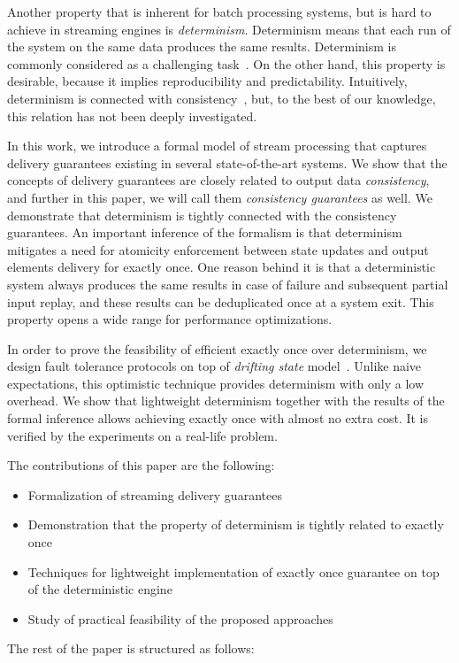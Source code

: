 Another property that is inherent for batch processing systems, but is hard to achieve in streaming engines is {\em determinism}. Determinism means that each run of the system on the same data produces the same results. Determinism is commonly considered as a challenging task~\cite{Zacheilas:2017:MDS:3093742.3093921}. On the other hand, this property is desirable, because it implies reproducibility and predictability. Intuitively, determinism is connected with consistency~\cite{Stonebraker:2005:RRS:1107499.1107504}, but, to the best of our knowledge, this relation has not been deeply investigated. 

In this work, we introduce a formal model of stream processing that captures delivery guarantees existing in several state-of-the-art systems. We show that the concepts of delivery guarantees are closely related to output data {\em consistency}, and further in this paper, we will call them {\em consistency guarantees} as well. We demonstrate that determinism is tightly connected with the consistency guarantees. An important inference of the formalism is that determinism mitigates a need for atomicity enforcement between state updates and output elements delivery for exactly once. One reason behind it is that a deterministic system always produces the same results in case of failure and subsequent partial input replay, and these results can be deduplicated once at a system exit. This property opens a wide range for performance optimizations.

In order to prove the feasibility of efficient exactly once over determinism, we design fault tolerance protocols on top of {\em drifting state} model~\cite{we2018adbis}. Unlike naive expectations, this optimistic technique provides determinism with only a low overhead. We show that lightweight determinism together with the results of the formal inference allows achieving exactly once with almost no extra cost. It is verified by the experiments on a real-life problem.

The contributions of this paper are the following: 
\begin{itemize}
    \item Formalization of streaming delivery guarantees 
    \item Demonstration that the property of determinism is tightly related to exactly once
    \item Techniques for lightweight implementation of exactly once guarantee on top of the deterministic engine
    \item Study of practical feasibility of the proposed approaches
\end{itemize}

The rest of the paper is structured as follows: 